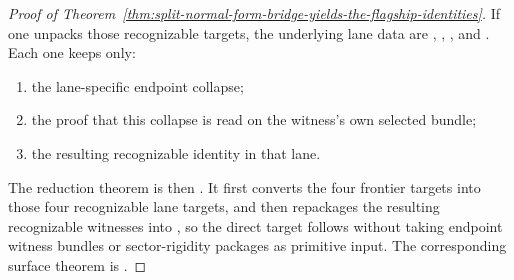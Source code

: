 \begin{proof}[Proof of Theorem~\ref{thm:split-normal-form-bridge-yields-the-flagship-identities}]
If one unpacks those recognizable targets, the underlying lane data are
,
,
, and
. Each one keeps only:
\begin{enumerate}
\item the lane-specific endpoint collapse;
\item the proof that this collapse is read on the witness's own selected
      bundle;
\item the resulting recognizable identity in that lane.
\end{enumerate}

The reduction theorem is then
.
It first converts the four frontier targets into those four recognizable lane
targets, and then repackages the resulting recognizable witnesses into
, so the direct target
 follows without taking endpoint witness
bundles or sector-rigidity packages as primitive input. The corresponding
surface theorem is
.


\end{proof}
